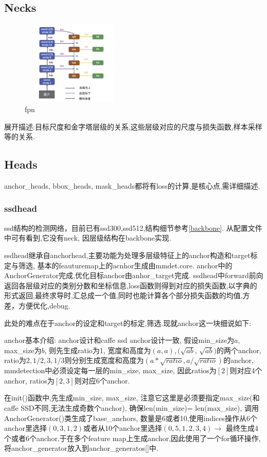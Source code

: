 \documentclass[UTF8]{ctexart}
\begin{document}
\subsection{Necks}
\begin{figure}[htbp]
	\centering
	\includegraphics[width=5cm,height=4cm]{./pic/fpn.png}
	\caption{fpn}
	\label{picfpn}
\end{figure}
展开描述:目标尺度和金字塔层级的关系,这些层级对应的尺度与损失函数,样本采样等的关系.
\subsection{Heads}
anchor\_heads, bbox\_heads, mask\_heads都将有loss的计算,是核心点,需详细描述.

\subsubsection{ssdhead}
ssd结构的检测网络，目前已有ssd300,ssd512,结构细节参考\ref{backbone}. 从配置文件中可有看到,它没有neck,
因层级结构在backbone实现.

ssdhead继承自anchorhead,主要功能为处理多层级特征上的anchor构造和target标定与筛选,
基本的feauturemap上的acnhor生成由mmdet.core.
anchor中的AnchorGenerator完成,优化目标anchor由anhor\_target完成.
ssdhead中forward前向返回各层级对应的类别分数和坐标信息,loss函数则得到对应的损失函数,以字典的形式返回,最终求导时,汇总成一个值,同时也能计算各个部分损失函数的均值,方差，方便优化,debug.

此处的难点在于anchor的设定和target的标定,筛选.现就anchor这一块细说如下:

anchor基本介绍: anchor设计和caffe ssd anchor设计一致, 假设min\_size为$a$, max\_size为$b$, 则先生成ratio为1, 宽度和高度为$(a, a), (\sqrt{ab}$, 
$\sqrt{ab})$的两个anchor, ratio为$2, 1/2, 3, 1/3$则分别生成宽度和高度为$(a*\sqrt{ratio}, a/\sqrt{ratio})$的anchor, mmdetection中必须设定每一层的min\_size, max\_size, 因此ratios为$[2]$则对应4个anchor, ratios为$[2,3]$则对应6个anchor.

在init()函数中,先生成min\_size, max\_size, 注意它这里是必须要指定max\_size(和caffe SSD不同,无法生成奇数个anchor), 确保len(min\_size)=
len(max\_size), 调用AnchorGenerator()类生成了base\_anchors, 数量是6或者10,使用indices操作从6个anchor里选择$(0, 3, 1, 2)$或者从10个anchor里选择$(0, 5, 1, 2, 3, 4) $$\rightarrow$ 最终生成4个或者6个anchor.于在多个feature map上生成anchor,因此使用了一个for循环操作, 将anchor\_generator放入到anchor\_generatos[]中.
\end{document}

